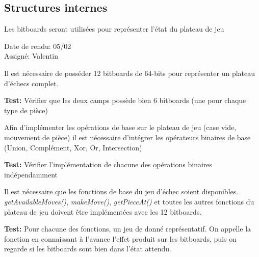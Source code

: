 \documentclass{article}
\begin{document}
\subsection{Structures internes}

\begin{needbox}
    Les bitboards seront utilisées pour représenter l'état du plateau de jeu
    \begin{duedatebox}
        Date de rendu: 05/02\\
        Assigné: Valentin
    \end{duedatebox}
    \begin{subneedbox}
        Il est nécessaire de posséder 12 bitboards de 64-bits pour représenter un
        plateau d'échecs complet.

        \textbf{Test:} Vérifier que les deux camps possède bien 6 bitboards (une pour chaque type de pièce) 
    \end{subneedbox}
    \begin{subneedbox}
        Afin d'implémenter les opérations de base sur le plateau de jeu (case vide, mouvement de pièce)
        il est nécessaire d'intégrer les opérateurs binaires de base (Union, Complément, Xor, Or, Intersection)

        \textbf{Test:} Vérifier l'implémentation de chacune des opérations binaires indépendamment
    \end{subneedbox}
    \begin{subneedbox}
        Il est nécessaire que les fonctions de base du jeu d'échec soient disponibles.
        \textit{getAvailableMoves()}, \textit{makeMove()}, \textit{getPieceAt()} et toutes 
        les autres fonctions du plateau de jeu doivent être implémentées avec les 12 bitboards.

        \textbf{Test:} Pour chacune des fonctions, un jeu de donné représentatif. On appelle la fonction
        en connaissant à l'avance l'effet produit sur les bitboards, puis on regarde si les bitboards sont
        bien dans l'état attendu.
    \end{subneedbox}
\end{needbox}
\end{document}
